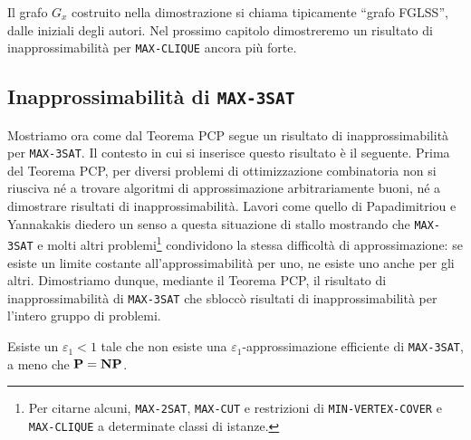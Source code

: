Il grafo $G_x$ costruito nella dimostrazione si chiama tipicamente
``grafo FGLSS'', dalle iniziali degli autori.
Nel prossimo capitolo dimostreremo un risultato di inapprossimabilità per
\texttt{MAX-CLIQUE} ancora più forte.

\subsection{Inapprossimabilità di \texttt{MAX-3SAT}}

Mostriamo ora come dal Teorema PCP segue un risultato di inapprossimabilità
per \texttt{MAX-3SAT}. Il contesto in cui si inserisce questo risultato è il
seguente.
Prima del Teorema PCP, per diversi problemi di ottimizzazione combinatoria non
si riusciva né a trovare algoritmi di approssimazione arbitrariamente buoni,
né a dimostrare risultati di inapprossimabilità.
Lavori come quello di Papadimitriou e Yannakakis \cite{PY91} diedero un senso a
questa situazione di stallo mostrando che \texttt{MAX-3SAT} e molti altri
problemi\footnote{Per citarne alcuni, \texttt{MAX-2SAT}, \texttt{MAX-CUT} e
restrizioni di \texttt{MIN-VERTEX-COVER} e \texttt{MAX-CLIQUE} a determinate
classi di istanze.} condividono la stessa difficoltà di approssimazione:
se esiste un limite costante all'approssimabilità per uno, ne esiste uno anche
per gli altri.
Dimostriamo dunque, mediante il Teorema PCP, il risultato di inapprossimabilità
di \texttt{MAX-3SAT} che sbloccò risultati di inapprossimabilità per l'intero
gruppo di problemi.

\begin{theorem} \label{thm:max-3sat}
	Esiste un $\varepsilon_1 < 1$ tale che non esiste una
	$\varepsilon_1$-approssimazione efficiente di \texttt{MAX-3SAT}, a meno che
	$\mathbf{P} = \mathbf{NP}$.
\end{theorem}

